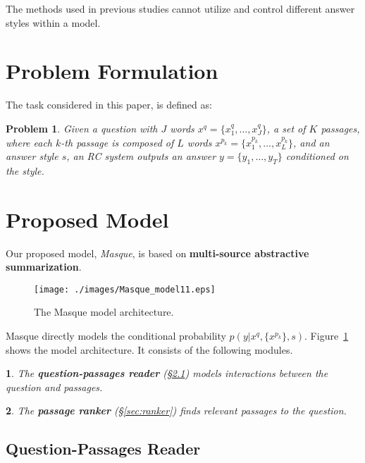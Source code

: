 \documentclass[11pt,a4paper]{article}
\theoremstyle{mydef}
\theoremstyle{myprob}
\newtheorem{problem}{Problem}
\newtheorem{layer1}{}
\begin{document}
The methods used in previous studies cannot utilize and control different answer styles within a model.


\section{Problem Formulation}
\label{sec:problem}

The task considered in this paper, is defined as:
\begin{problem}
\label{prob:prob}
Given a question with $J$ words $x^q = \{x^q_1, \ldots, x^q_J\}$, a set of $K$ passages, where each $k$-th passage is composed of $L$ words $x^{p_k} = \{x^{p_k}_1, \ldots, x^{p_k}_{L}\}$, and an answer style $s$, an RC system %
outputs an answer $y = \{y_1, \ldots, y_T \}$ conditioned on the style.
\end{problem}

\section{Proposed Model} 

Our proposed model, \textit{Masque}, is based on \textbf{multi-source abstractive summarization}.



\begin{figure}[t!]
\centering
\texttt{[image: ./images/Masque\_model11.eps]}
\caption{The Masque model architecture.}
\label{fig:model}
\end{figure}

Masque directly models 
the conditional probability $p(y|x^q, \{x^{p_k}\}, s)$.
Figure~\ref{fig:model} shows the model architecture. It consists of the following modules.
\begin{layer1}
The \textbf{question-passages reader} (\S\ref{sec:reader}) models interactions between the question and passages.
\end{layer1}
\begin{layer1}
The \textbf{passage ranker} (\S\ref{sec:ranker}) finds relevant passages to the question.
\end{layer1}

\subsection{Question-Passages Reader}
\label{sec:reader}
\end{document}
